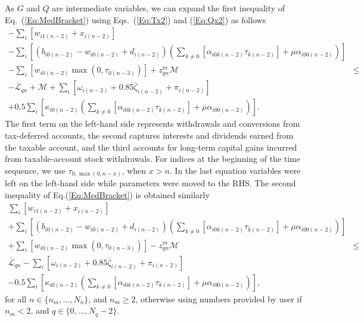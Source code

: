 \documentclass{report}[fleqn,11pt]
\begin{document}
	As $G$ and $Q$ are intermediate variables, we can expand the first inequality of Eq.~(\ref{Eq:MedBracket})
	using Eqs.~(\ref{Eq:Tx2}) and (\ref{Eq:Qx2}) as follows
	\begin{eqnarray}
		\label{Eq:Med1}
		- \sum_i [w_{i1(n-2)} + x_{i(n-2)}] && \nonumber \\
		- \sum_i \left[(b_{i0(n-2)} - w_{i0(n-2)} + d_{i(n-2)})
                \left(\sum_{k\neq 0}[\alpha_{i0k(n-2)}\tau_{k(n-2)}] + \mu\alpha_{i00(n-2)}\right)\right] &&
		\nonumber \\
		- \sum_i [w_{i0(n-2)}\max(0, \tau_{0(n-3)})] + z_{qn}^m \mathcal{M}
		& \leq& \nonumber \\
                - \bar{\mathcal{L}}_{qn} + \mathcal{M}
		+ \sum_i [\omega_{i(n-2)} + 0.85\bar\zeta_{i(n-2)} + \pi_{i(n-2)}] && \nonumber\\
		+ 0.5\sum_{i} \left[\kappa_{i0(n-2)} \left(\sum_{k\neq 0}[\alpha_{i0k(n-2)}\tau_{k(n-2)}] + \mu\alpha_{i00(n-2)}\right)\right]. && 
	\end{eqnarray}
	The first term on the left-hand side represents withdrawals and conversions from tax-deferred accounts,
        the second captures interests and dividends earned from the taxable account,
        and the third accounts for long-term capital gains incurred from taxable-account stock withdrawals.
	For indices at the beginning of the time sequence, we use $\tau_{0, \max(0, n-x)}$, when $x>n$.
	In the last equation variables were left on the left-hand side
        while parameters were moved to the RHS. The second inequality of Eq.(\ref{Eq:MedBracket})
        is obtained similarly
	\begin{eqnarray}
		\label{Eq:Med2}
		\sum_i [w_{i1(n-2)} + x_{i(n-2)}] && \nonumber \\
		+ \sum_i \left[(b_{i0(n-2)} - w_{i0(n-2)} + d_{i(n-2)})
                \left(\sum_{k\neq 0}[\alpha_{i0k(n-2)}\tau_{k(n-2)}] + \mu\alpha_{i00(n-2)}\right)\right] &&
		\nonumber \\
		+ \sum_i [w_{i0(n-2)}\max(0, \tau_{0(n-3)})] - z_{qn}^m \mathcal{M}
		& \leq& \nonumber \\
                 \bar{\mathcal{L}}_{qn}
		- \sum_i [\omega_{i(n-2)} + 0.85\bar\zeta_{i(n-2)} + \pi_{i(n-2)}] && \nonumber\\
		- 0.5\sum_{i} \left[\kappa_{i0(n-2)} \left(\sum_{k\neq 0}[\alpha_{i0k(n-2)}\tau_{k(n-2)}] + \mu\alpha_{i00(n-2)}\right)\right], && 
	\end{eqnarray}
	for all $n \in \{n_m, \ldots, N_n\}$, and $n_m \ge 2$,
	otherwise using numbers provided by user if $n_m < 2$, and $q \in \{0,\ldots,N_q - 2\}$.
\end{document}
